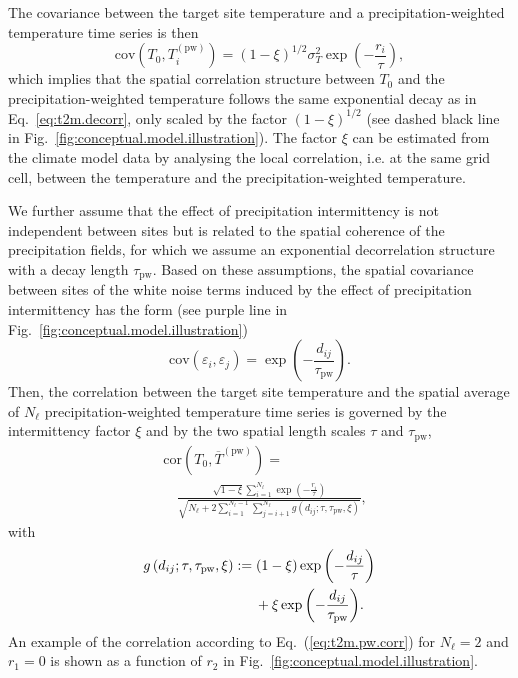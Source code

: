 \documentclass[cp]{copernicus}
\begin{document}
The covariance between the target site temperature and a precipitation-weighted
temperature time series is then
%
\begin{equation}
\label{eq:t2m.pw.decorr}
\mathrm{cov}\left(T_0,T_i^{\mathrm{(pw)}}\right)=
\left(1-\xi\right)^{1/2}\sigma_T^2\exp{\left(-\frac{r_i}{\tau}\right)},
\end{equation}
%
which implies that the spatial correlation structure between $T_0$ and the
precipitation-weighted temperature follows the same exponential decay as in
Eq.~\eqref{eq:t2m.decorr}, only scaled by the factor $(1-\xi)^{1/2}$ (see dashed
black line in Fig.~\ref{fig:conceptual.model.illustration}). The factor $\xi$
can be estimated from the climate model data by analysing the local correlation,
i.e. at the same grid cell, between the temperature and the
precipitation-weighted temperature.

We further assume that the effect of precipitation intermittency is not
independent between sites but is related to the spatial coherence of the
precipitation fields, for which we assume an exponential decorrelation structure
with a decay length $\tau_{\mathrm{pw}}$. Based on these assumptions, the
spatial covariance between sites of the white noise terms induced by the effect
of precipitation intermittency has the form (see purple line in
Fig.~\ref{fig:conceptual.model.illustration})
%
\begin{equation}
\label{eq:noise.cov}
\mathrm{cov}\left(\varepsilon_i,\varepsilon_j\right)=
\exp{\left(-\frac{d_{ij}}{\tau_{\mathrm{pw}}}\right)}.
\end{equation}
%
Then, the correlation between the target site temperature and the spatial
average of $N_{\ell}$ precipitation-weighted temperature time series is governed
by the intermittency factor $\xi$ and by the two spatial length scales $\tau$
and $\tau_{\mathrm{pw}}$,
%
\begin{equation}
\label{eq:t2m.pw.corr}
\begin{split}
&\mathrm{cor}\left(T_0,\overline{T}^{\mathrm{(pw)}}\right)=\\
&\quad\frac
{\sqrt{1-\xi}\sum_{i=1}^{N_{\ell}}\exp{\left(-\frac{r_i}{\tau}\right)}}
{\sqrt{N_{\ell} + 2\sum_{i=1}^{N_{\ell}-1}\sum_{j=i+1}^{N_{\ell}}
  g\left(d_{ij}; \tau, \tau_{\mathrm{pw}}, \xi\right)}},
\end{split}
\end{equation}
%
with
\begin{equation}
\label{eq:exp.fun}
\begin{split}
g\left(d_{ij}; \tau, \tau_{\mathrm{pw}}, \xi\right)&:=
\left(1-\xi\right)\exp{\left(-\frac{d_{ij}}{\tau}\right)}\\ & \phantom{{}={}}\hspace{0.2em} +
\xi\exp{\left(-\frac{d_{ij}}{\tau_{\mathrm{pw}}}\right)}.
\end{split}
\end{equation}
%
An example of the correlation according to Eq.~(\ref{eq:t2m.pw.corr}) for
$N_{\ell}=2$ and $r_1=0$ is shown as a function of $r_2$ in
Fig.~\ref{fig:conceptual.model.illustration}.
\end{document}
